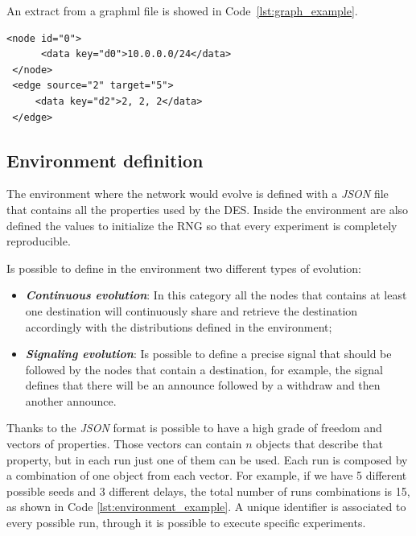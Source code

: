 An extract from a graphml file is showed in Code~\ref{lst:graph_example}.
\begin{lstlisting}[language=graphml, caption=Graph example, label=lst:graph_example]
 <node id="0">
      <data key="d0">10.0.0.0/24</data>
 </node>
 <edge source="2" target="5">
     <data key="d2">2, 2, 2</data>
 </edge>
\end{lstlisting}

\subsection{Environment definition}
\label{subsec:exp_environments_definition}

The environment where the network would evolve is defined with a \textit{JSON}
file that contains all the properties used by the \ac{DES}.
Inside the environment are also defined the values to initialize the \ac{RNG}
so that every experiment is completely reproducible.

Is possible to define in the environment two different types of evolution:
\begin{itemize}
    \item \textbf{\textit{Continuous evolution}}: In this category all the nodes
    that contains at least one destination will continuously share and retrieve
    the destination accordingly with the distributions defined in the environment;
    \item \textbf{\textit{Signaling evolution}}: Is possible to define a precise
    signal that should be followed by the nodes that contain a destination, for
    example, the signal  defines that there will be an announce followed by
    a withdraw and then another announce.
\end{itemize}

Thanks to the \textit{JSON} format is possible to have a high grade of
freedom and vectors of properties.
Those vectors can contain $n$ objects that describe that property, but in each
run just one of them can be used.
Each run is composed by a combination of one object from each vector.
For example, if we have \num{5} different possible seeds and \num{3} different
delays, the total number of runs combinations is \num{15}, as shown in Code
\ref{lst:environment_example}.
A unique identifier is associated to every possible run, through it is possible
to execute specific experiments.

